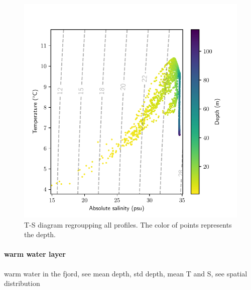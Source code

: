 \documentclass[12pt,a4paper]{article}
\begin{document}
\begin{figure}
  \centering
  \includegraphics{ts}
  \caption{\label{fig:ts}T-S diagram regroupping all profiles. The color
    of points represents the depth.}
\end{figure}

\paragraph{warm water layer}
warm water in the fjord, see mean depth, std depth, mean T and S, see spatial
distribution
\end{document}
